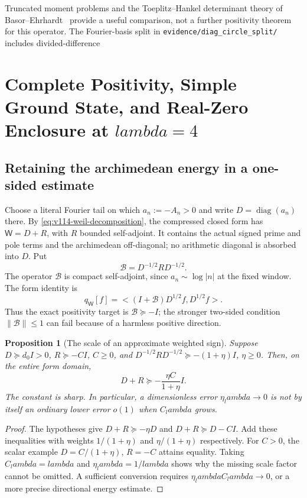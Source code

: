 \documentclass[11pt]{article}
\def\lambda{lambda}%
\def\ip#1#2{<#1,#2>}%
\newtheorem{proposition}[theorem]{Proposition}
\theoremstyle{remark}
\newcommand{\ip}[2]{\left\langle #1,#2\right\rangle}
\begin{document}
Truncated moment problems and the Toeplitz--Hankel determinant theory
of Basor--Ehrhardt~\cite{BasorEhrhardt2002} provide a useful comparison,
not a further positivity theorem for this operator. The Fourier-basis
split in \texttt{evidence/diag\_circle\_split/} includes divided-difference


\section{Complete Positivity, Simple Ground State, and Real-Zero Enclosure at \texorpdfstring{$\lambda=4$}{lambda=4}}\label{sec:pillar2}

\subsection{Retaining the archimedean energy in a one-sided estimate}

Choose a literal Fourier tail on which $a_n:=-A_n>0$ and write
$D=\operatorname{diag}(a_n)$ there. By
\eqref{eq:v114-weil-decomposition}, the compressed closed form has
$\mathsf W=D+R$, with $R$ bounded self-adjoint. It contains the
actual signed prime and pole terms and the archimedean off-diagonal;
no arithmetic diagonal is absorbed into $D$. Put
\begin{equation}\label{eq:v120-weighted-remainder}
 \mathcal B=D^{-1/2}R D^{-1/2}.
\end{equation}
The operator $\mathcal B$ is compact self-adjoint, since
$a_n\sim\log|n|$ at the fixed window. The form identity is
\[
 q_{\mathsf W}[f]
 =\ip{(I+\mathcal B)D^{1/2}f}{D^{1/2}f}.
\]
Thus the exact positivity target is $\mathcal B\succeq-I$;
the stronger two-sided condition $\|\mathcal B\|\le1$ can fail
because of a harmless positive direction.

\begin{proposition}[The scale of an approximate weighted sign]
\label{prop:v120-weighted-error}
Suppose $D\succeq d_0I>0$, $R\succeq-CI$, $C\ge0$, and
$D^{-1/2}RD^{-1/2}\succeq-(1+\eta)I$, $\eta\ge0$.
Then, on the entire form domain,
\begin{equation}\label{eq:v120-weighted-error}
 D+R\succeq-\frac{\eta C}{1+\eta}I.
\end{equation}
The constant is sharp. In particular, a dimensionless error
$\eta_\lambda\to0$ is not by itself an ordinary lower error
$o(1)$ when $C_\lambda$ grows.
\end{proposition}
\begin{proof}
The hypotheses give $D+R\succeq-\eta D$ and
$D+R\succeq D-CI$. Add these inequalities with weights
$1/(1+\eta)$ and $\eta/(1+\eta)$ respectively. For $C>0$,
the scalar example $D=C/(1+\eta)$, $R=-C$ attains equality.
Taking $C_\lambda=\lambda$ and $\eta_\lambda=1/\lambda$
shows why the missing scale factor cannot be omitted. A sufficient
conversion requires $\eta_\lambda C_\lambda\to0$, or a more
precise directional energy estimate.
\end{proof}
\end{document}
